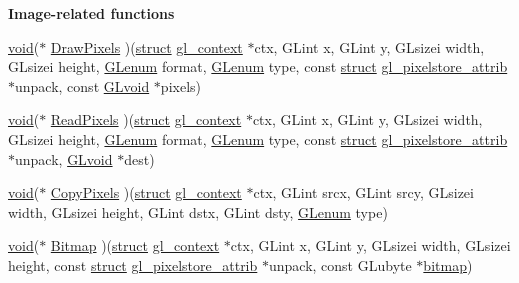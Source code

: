 \begin{Indent}\textbf{ Image-\/related functions}\par
\begin{DoxyCompactItemize}
\item 
\hyperlink{interfacevoid}{void}($\ast$ \hyperlink{structdd__function__table_a1970141fc8c558da3b315002a6157da3}{Draw\+Pixels} )(\hyperlink{interfacestruct}{struct} \hyperlink{structgl__context}{gl\+\_\+context} $\ast$ctx, G\+Lint x, G\+Lint y, G\+Lsizei width, G\+Lsizei height, \hyperlink{interfacevoid}{G\+Lenum} format, \hyperlink{interfacevoid}{G\+Lenum} type, const \hyperlink{interfacestruct}{struct} \hyperlink{structgl__pixelstore__attrib}{gl\+\_\+pixelstore\+\_\+attrib} $\ast$unpack, const \hyperlink{interfacevoid}{G\+Lvoid} $\ast$pixels)
\item 
\hyperlink{interfacevoid}{void}($\ast$ \hyperlink{structdd__function__table_a2327fc5203c524e7db433dbdbbdb644f}{Read\+Pixels} )(\hyperlink{interfacestruct}{struct} \hyperlink{structgl__context}{gl\+\_\+context} $\ast$ctx, G\+Lint x, G\+Lint y, G\+Lsizei width, G\+Lsizei height, \hyperlink{interfacevoid}{G\+Lenum} format, \hyperlink{interfacevoid}{G\+Lenum} type, const \hyperlink{interfacestruct}{struct} \hyperlink{structgl__pixelstore__attrib}{gl\+\_\+pixelstore\+\_\+attrib} $\ast$unpack, \hyperlink{interfacevoid}{G\+Lvoid} $\ast$dest)
\item 
\hyperlink{interfacevoid}{void}($\ast$ \hyperlink{structdd__function__table_ae355c1c39a2145ace1c81e2fb285890b}{Copy\+Pixels} )(\hyperlink{interfacestruct}{struct} \hyperlink{structgl__context}{gl\+\_\+context} $\ast$ctx, G\+Lint srcx, G\+Lint srcy, G\+Lsizei width, G\+Lsizei height, G\+Lint dstx, G\+Lint dsty, \hyperlink{interfacevoid}{G\+Lenum} type)
\item 
\hyperlink{interfacevoid}{void}($\ast$ \hyperlink{structdd__function__table_a438e3b6bcb20c0503c6e45565e1b416a}{Bitmap} )(\hyperlink{interfacestruct}{struct} \hyperlink{structgl__context}{gl\+\_\+context} $\ast$ctx, G\+Lint x, G\+Lint y, G\+Lsizei width, G\+Lsizei height, const \hyperlink{interfacestruct}{struct} \hyperlink{structgl__pixelstore__attrib}{gl\+\_\+pixelstore\+\_\+attrib} $\ast$unpack, const G\+Lubyte $\ast$\hyperlink{structbitmap}{bitmap})
\end{DoxyCompactItemize}
\end{Indent}
